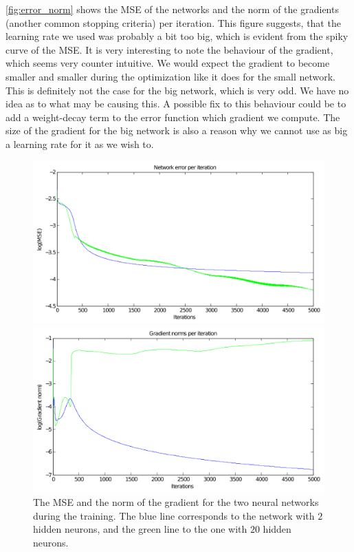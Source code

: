 \documentclass[11pt,a4paper]{article}
\begin{document}
\autoref{fig:error_norm} shows the MSE of the networks and the
norm of the gradients (another common stopping criteria) per iteration. This
figure suggests, that the learning rate we used was probably a bit too big,
which is evident from the spiky curve of the MSE. It is very interesting to
note the behaviour of the gradient, which seems very counter intuitive. We
would expect the gradient to become smaller and smaller during the
optimization like it does for the small network. This is definitely not the
case for the big network, which is very odd. We
have no idea as to what may be causing this. A possible fix to this behaviour
could be to add a weight-decay term to the error function which gradient we
compute. The size of the gradient for the big network is also a reason why we
cannot use as big a learning rate for it as we wish to.

\begin{figure}[htbp]
    \centering
    \begin{minipage}[b]{\linewidth}
        \centering
        \includegraphics[width=\textwidth]{figures/errors.pdf}
    \end{minipage}

    \begin{minipage}[b]{\linewidth}
        \centering
        \includegraphics[width=\textwidth]{figures/norms.pdf}
    \end{minipage}
    \caption{The MSE and the norm of the gradient for the two neural networks
        during the training. The blue line corresponds to the network with $2$
    hidden neurons, and the green line to the one with $20$ hidden neurons.}
    \label{fig:error_norm}
\end{figure}
\end{document}
